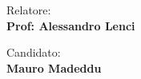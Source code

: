 \begin{titlepage}
\begin{center}
\end{center}
\vspace{30mm}

\begin{minipage}[t]{0.47\textwidth}
	{\large{Relatore:}{\normalsize\vspace{3mm}
	\bf\\ \large{Prof: Alessandro Lenci}}}
\end{minipage}
\hfill
\begin{minipage}[t]{0.47\textwidth}\raggedleft
	{\large{Candidato:}{\normalsize\vspace{3mm} \bf\\ \large{Mauro Madeddu}}}
\end{minipage}

\vspace{30mm}
\hrulefill
\\

\end{titlepage}